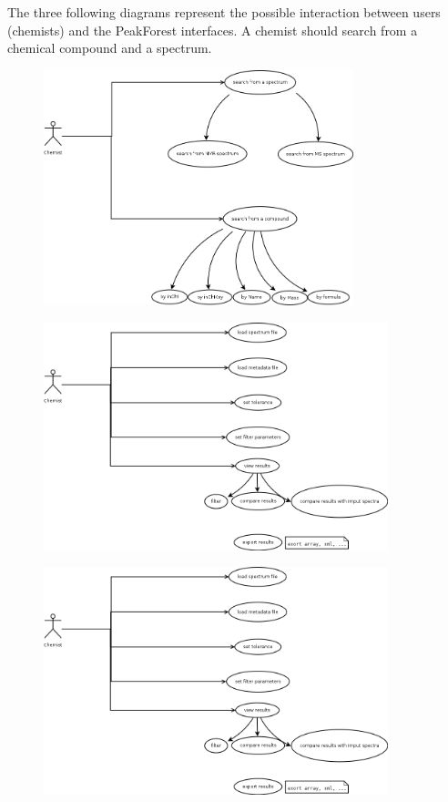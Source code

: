The three following diagrams represent the possible interaction between users (chemists) and the PeakForest interfaces. A chemist should search from a chemical compound and a spectrum. 

\begin{figure}[h!]
	\centerline{\includegraphics[width=9cm]{files/images/peakforest_gui_uml_searches.png}}
\end{figure}

\begin{figure}[h!]
	\centerline{\includegraphics[width=10cm]{files/images/peakforest_gui_uml_search_NMR.png}}
\end{figure}

\begin{figure}[h!]
	\centerline{\includegraphics[width=10cm]{files/images/peakforest_gui_uml_search_MS.png}}
\end{figure}





